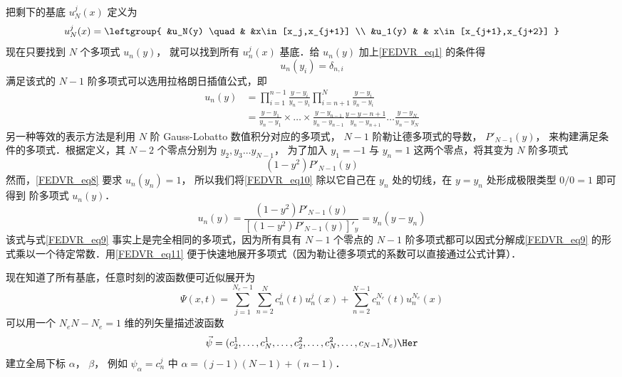 把剩下的基底 $u_N^j(x)$ 定义为
\begin{equation}
u_N^j(x) = \leftgroup{
&u_N(y) \quad & &x\in[x_j,x_{j+1}] \\
&u_1(y)  & & x\in[x_{j+1},x_{j+2}]
}\end{equation}
现在只要找到 $N$ 个多项式 $u_n(y)$， 就可以找到所有 $u_n^j(x)$ 基底．给 $u_n(y)$ 加上\autoref{FEDVR_eq1} 的条件得
\begin{equation}\label{FEDVR_eq8}
u_n(y_i) = \delta_{n,i}
\end{equation}
满足该式的 $N-1$ 阶多项式可以选用拉格朗日插值公式，即
\begin{equation}\label{FEDVR_eq9}\begin{aligned}
u_n(y) &= \prod_{i=1}^{n-1} \frac{y-y_i}{y_n-y_i} \prod_{i=n+1}^{N} \frac{y-y_i}{y_n-y_i}\\
&= \frac{y-y_1}{y_n-y_1} \times\dots\times\frac{y-y_{n-1}}{y_n-y_{n-1}}\frac{y-y-{n+1}}{y_n-y_{n+1}} \dots \frac{y-y_N}{y_n-y_N}
\end{aligned}\end{equation}
另一种等效的表示方法是利用 $N$ 阶 Gauss-Lobatto 数值积分对应的多项式， $N-1$ 阶勒让德多项式的导数， $P'_{N-1}(y)$，  来构建满足条件的多项式．根据定义，其 $N-2$ 个零点分别为 $y_2, y_3\dots y_{N-1}$， 为了加入 $y_1=-1$ 与 $y_n=1$ 这两个零点，将其变为 $N$ 阶多项式
\begin{equation}\label{FEDVR_eq10}
(1-y^2)P'_{N-1}(y)
\end{equation}
然而，\autoref{FEDVR_eq8} 要求 $u_n(y_n)=1$， 所以我们将\autoref{FEDVR_eq10} 除以它自己在 $y_n$ 处的切线，在 $y=y_n$ 处形成极限类型 $0/0=1$ 即可得到 阶多项式 $u_n(y)$． 
\begin{equation}\label{FEDVR_eq11}
u_n(y) = \frac{(1-y^2)P'_{N-1}(y)}{[(1-y^2)P'_{N-1}(y)]'_y} = y_n (y-y_n)
\end{equation}
该式与式\autoref{FEDVR_eq9} 事实上是完全相同的多项式，因为所有具有 $N-1$ 个零点的 $N-1$ 阶多项式都可以因式分解成\autoref{FEDVR_eq9} 的形式乘以一个待定常数．用\autoref{FEDVR_eq11} 便于快速地展开多项式（因为勒让德多项式的系数可以直接通过公式计算）．

现在知道了所有基底，任意时刻的波函数便可近似展开为
\begin{equation}
\Psi(x,t) = \sum_{j=1}^{N_e-1}\sum_{n=2}^{N} c_n^j(t) u_n^j(x) + \sum_{n=2}^{N-1} c_n^{N_e}(t) u_n^{N_e}(x)
\end{equation}
可以用一个 $N_eN-N_e=1$ 维的列矢量描述波函数
\begin{equation}
\vec\psi = (c_2^1,\dots,c_N^1,\dots,c_2^2,\dots,c_N^2,\dots,c_{N-1}{N_e})\Her
\end{equation}
建立全局下标 $\alpha$， $\beta$， 例如 $\psi_\alpha=c_n^j$ 中 $\alpha=(j-1)(N-1)+(n-1)$． 

